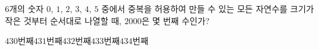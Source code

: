 $6$개의 숫자 $0$, $1$, $2$, $3$, $4$, $5$ 중에서 중복을 허용하여 만들 수 있는 모든 자연수를 크기가 작은 것부터 순서대로 나열할 때, $2000$은 몇 번째 수인가?
\begin{choices32}{$430$번째}{$431$번째}{$432$번째}{$433$번째}{$434$번째}\end{choices32}
